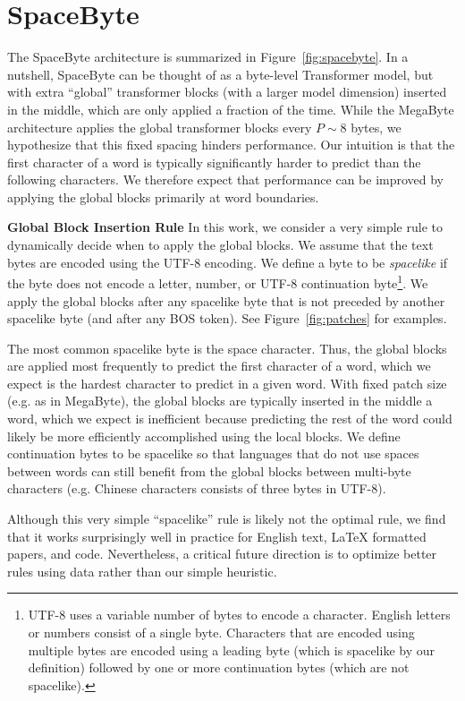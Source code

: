 \section{SpaceByte}
\label{sec:spacebyte}

The SpaceByte architecture is summarized in Figure~\ref{fig:spacebyte}.
In a nutshell, SpaceByte can be thought of as a byte-level Transformer model, but with extra ``global'' transformer blocks (with a larger model dimension) inserted in the middle, which are only applied a fraction of the time. While the MegaByte architecture applies the global transformer blocks every $P\sim8$ bytes, we hypothesize that this fixed spacing hinders performance. Our intuition is that the first character of a word is typically significantly harder to predict than the following characters. We therefore expect that performance can be improved by applying the global blocks primarily at word boundaries.

\textbf{Global Block Insertion Rule} In this work, we consider a very simple rule to dynamically decide when to apply the global blocks. We assume that the text bytes are encoded using the UTF-8 encoding. We define a byte to be \emph{spacelike} if the byte does not encode a letter, number, or UTF-8 continuation byte\footnote{
  UTF-8 uses a variable number of bytes to encode a character. English letters or numbers consist of a single byte. Characters that are encoded using multiple bytes are encoded using a leading byte (which is spacelike by our definition) followed by one or more continuation bytes (which are not spacelike).}. We apply the global blocks after any spacelike byte that is not preceded by another spacelike byte (and after any BOS token). See Figure~\ref{fig:patches} for examples.

The most common spacelike byte is the space character. Thus, the global blocks are applied most frequently to predict the first character of a word, which we expect is the hardest character to predict \cite{alrfou2019character} in a given word. With fixed patch size (e.g. as in MegaByte), the global blocks are typically inserted in the middle a word, which we expect is inefficient because predicting the rest of the word could likely be more efficiently accomplished using the local blocks. We define continuation bytes to be spacelike so that languages that do not use spaces between words can still benefit from the global blocks between multi-byte characters (e.g. Chinese characters consists of three bytes in UTF-8).

Although this very simple ``spacelike'' rule is likely not the optimal rule, we find that it works surprisingly well in practice for English text, LaTeX formatted papers, and code. Nevertheless, a critical future direction is to optimize \cite{mofijul2022vocabulary,godey2022MANTa,nawrot2022pooling} better rules using data rather than our simple heuristic.

